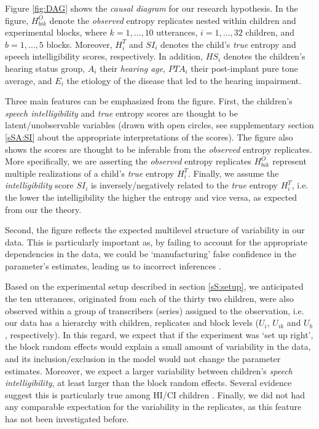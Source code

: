 Figure \ref{fig:DAG} shows the \textit{causal diagram} for our research hypothesis. In the figure, $H^{O}_{bik}$ denote the \textit{observed} entropy replicates nested within children and experimental blocks, where $k=1,\dots,10$ utterances, $i=1,\dots,32$ children, and $b=1,\dots,5$ blocks. Moreover, $H^{T}_{i}$ and $SI_{i}$ denotes the child's \textit{true} entropy and speech intelligibility scores, respectively. In addition, $HS_{i}$ denotes the children's hearing status group, $A_{i}$ their \textit{hearing age}, $PTA_{i}$ their post-implant pure tone average, and $E_{i}$ the etiology of the disease that led to the hearing impairment.

Three main features can be emphasized from the figure. First, the children's \textit{speech intelligibility} and \textit{true} entropy scores are thought to be latent/unobservable variables \cite{Everitt_1984} (drawn with open circles, see supplementary section \ref{sSA:SI} about the appropriate interpretations of the scores). The figure also shows the scores are thought to be inferable from the \textit{observed} entropy replicates. More specifically, we are asserting the \textit{observed} entropy replicates $H^{O}_{bik}$ represent multiple realizations of a child's \textit{true} entropy $H^{T}_{i}$. Finally, we assume the \textit{intelligibility} score $SI_{i}$ is inversely/negatively related to the \textit{true} entropy $H^{T}_{i}$, i.e. the lower the intelligibility the higher the entropy and vice versa, as expected from our the theory. 

Second, the figure reflects the expected multilevel structure of variability in our data. This is particularly important as, by failing to account for the appropriate dependencies in the data, we could be `manufacturing' false confidence in the parameter's estimates, leading us to incorrect inferences \cite{McElreath_2020}. 

Based on the experimental setup described in section \ref{sS:setup}, we anticipated the ten utterances, originated from each of the thirty two children, were also observed within a group of transcribers (series) assigned to the observation, i.e. our data has a hierarchy with children, replicates and block levels ($U_{i}$, $U_{ik}$ and $U_{b}$, respectively). In this regard, we expect that if the experiment was `set up right', the block random effects would explain a small amount of variability in the data, and its inclusion/exclusion in the model would not change the parameter estimates. Moreover, we expect a larger variability between children's \textit{speech intelligibility}, at least larger than the block random effects. Several evidence suggest this is particularly true among HI/CI children \cite{Young_et_al_2002, Peng_et_al_2004, Montag_et_al_2014, Castellanos_et_al_2014, Yanbay_et_al_2014, Nittrouer_et_al_2014, Freeman_et_al_2017}. Finally, we did not had any comparable expectation for the variability in the replicates, as this feature has not been investigated before.

